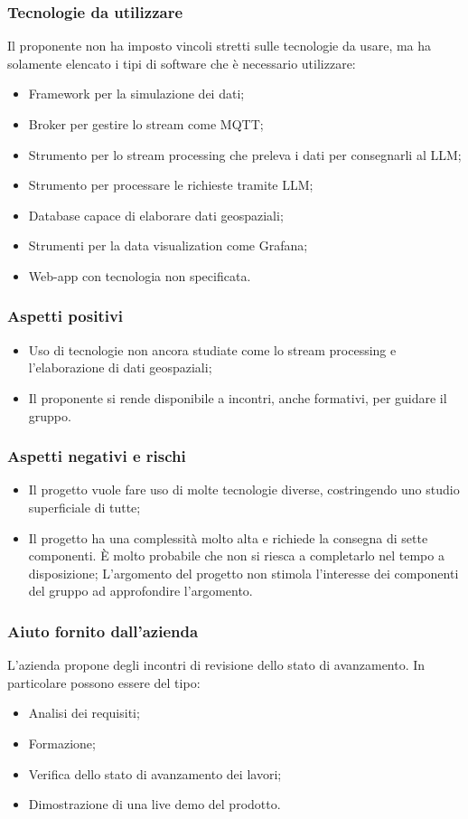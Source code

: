 \documentclass[10pt]{article}
\begin{document}
\subsubsection{Tecnologie da utilizzare}
Il proponente non ha imposto vincoli stretti sulle tecnologie da usare, ma ha solamente elencato i tipi di software che è necessario utilizzare:
\begin{itemize}
    \item Framework per la simulazione dei dati;
    \item Broker per gestire lo stream come MQTT;
    \item Strumento per lo stream processing che preleva i dati per consegnarli al LLM;
    \item Strumento per processare le richieste tramite LLM;
    \item Database capace di elaborare dati geospaziali;
    \item Strumenti per la data visualization come Grafana;
    \item Web-app con tecnologia non specificata.
\end{itemize}
\subsubsection{Aspetti positivi}
\begin{itemize}
    \item Uso di tecnologie non ancora studiate come lo stream processing e l’elaborazione di dati geospaziali;
    \item Il proponente si rende disponibile a incontri, anche formativi, per guidare il gruppo.
\end{itemize}
\subsubsection{Aspetti negativi e rischi}
\begin{itemize}
    \item Il progetto vuole fare uso di molte tecnologie diverse, costringendo uno studio superficiale di tutte;
    \item Il progetto ha una complessità molto alta e richiede la consegna di sette componenti. È molto probabile che non si riesca a completarlo nel tempo a disposizione;
    L’argomento del progetto non stimola l’interesse dei componenti del gruppo ad approfondire l’argomento.
\end{itemize}
\subsubsection{Aiuto fornito dall'azienda}
L’azienda propone degli incontri di revisione dello stato di avanzamento. In particolare possono essere del tipo:
\begin{itemize}
    \item Analisi dei requisiti;
    \item Formazione;
    \item Verifica dello stato di avanzamento dei lavori;
    \item Dimostrazione di una live demo del prodotto.
\end{itemize}
\end{document}
